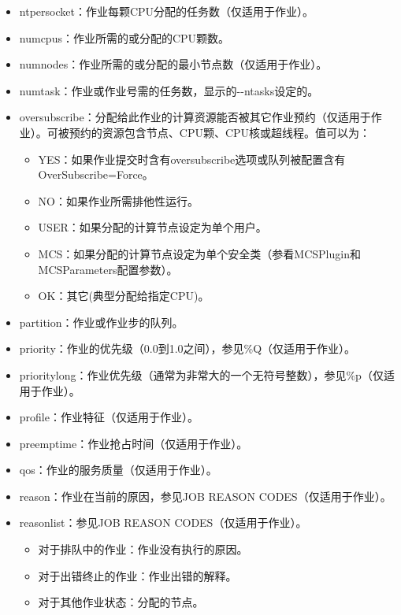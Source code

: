 \begin{itemize}
\begin{itemize}
\begin{itemize}
    \item ntpersocket：作业每颗CPU分配的任务数（仅适用于作业）。
    \item numcpus：作业所需的或分配的CPU颗数。
    \item numnodes：作业所需的或分配的最小节点数（仅适用于作业）。
    \item numtask：作业或作业号需的任务数，显示的-{}-ntasks设定的。
    \item oversubscribe：分配给此作业的计算资源能否被其它作业预约（仅适用于作业）。可被预约的资源包含节点、CPU颗、CPU核或超线程。值可以为：
\begin{itemize}
	\item YES：如果作业提交时含有oversubscribe选项或队列被配置含有\\OverSubscribe=Force。
   	\item NO：如果作业所需排他性运行。
   	\item USER：如果分配的计算节点设定为单个用户。
   	\item MCS：如果分配的计算节点设定为单个安全类（参看MCSPlugin和\\MCSParameters配置参数）。
   	\item OK：其它(典型分配给指定CPU)。
\end{itemize}
   	\item partition：作业或作业步的队列。
   	\item priority：作业的优先级（0.0到1.0之间），参见\%Q（仅适用于作业）。
   	\item prioritylong：作业优先级（通常为非常大的一个无符号整数），参见\%p（仅适用于作业）。
   	\item profile：作业特征（仅适用于作业）。
   	\item preemptime：作业抢占时间（仅适用于作业）。
   	\item qos：作业的服务质量（仅适用于作业）。
   	\item reason：作业在当前的原因，参见JOB REASON CODES（仅适用于作业）。
   	\item reasonlist：参见JOB REASON CODES（仅适用于作业）。
   	\begin{itemize}
   	   	\item 对于排队中的作业：作业没有执行的原因。
   	   	\item 对于出错终止的作业：作业出错的解释。
   	   	\item 对于其他作业状态：分配的节点。
   	\end{itemize}

\end{itemize}
\end{itemize}
\end{itemize}
